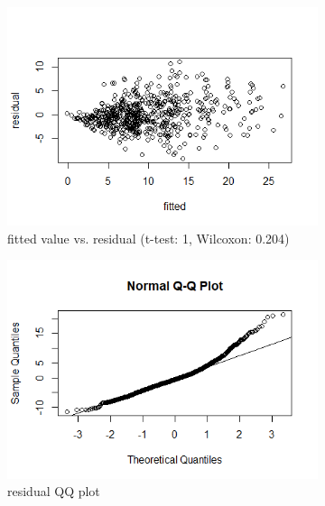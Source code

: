 \begin{figure}[H]
\centering
\begin{subfigure}{.24\textwidth}
  \centering
  \includegraphics[width=1\linewidth]{../../plots/residual_treatment.png}
  \caption{fitted value vs. residual (t-test: 1, Wilcoxon: 0.204)}
  \label{fig:5a}
\end{subfigure}
\begin{subfigure}{.24\textwidth}
  \centering
  \includegraphics[width=1\linewidth]{../../plots/qq_residual_treatment.png}
  \caption{residual QQ plot}
  \label{fig:5b}
\end{subfigure}
\begin{subfigure}{.24\textwidth}
  \centering

\end{subfigure}
\end{figure}
